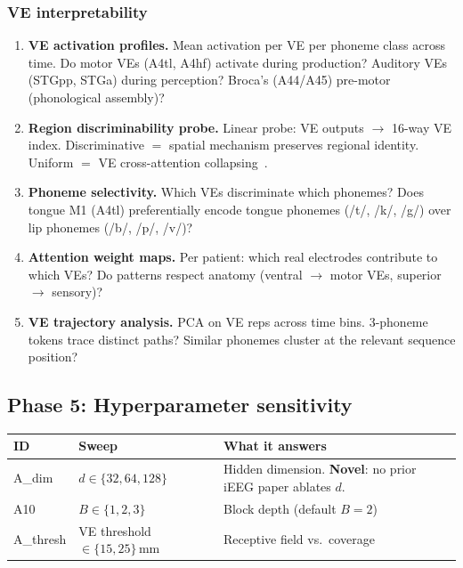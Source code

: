 \documentclass[11pt,letterpaper]{article}
\begin{document}
\subsubsection{VE interpretability}

\begin{enumerate}[leftmargin=2em]
\item \textbf{VE activation profiles.} Mean activation per VE per phoneme class across time. Do motor VEs (A4tl, A4hf) activate during production? Auditory VEs (STGpp, STGa) during perception? Broca's (A44/A45) pre-motor (phonological assembly)?
\item \textbf{Region discriminability probe.} Linear probe: VE outputs $\to$ 16-way VE index. Discriminative $=$ spatial mechanism preserves regional identity. Uniform $=$ VE cross-attention collapsing~\cite{zhang2025neds}.
\item \textbf{Phoneme selectivity.} Which VEs discriminate which phonemes? Does tongue M1 (A4tl) preferentially encode tongue phonemes (/t/, /k/, /g/) over lip phonemes (/b/, /p/, /v/)?
\item \textbf{Attention weight maps.} Per patient: which real electrodes contribute to which VEs? Do patterns respect anatomy (ventral $\to$ motor VEs, superior $\to$ sensory)?
\item \textbf{VE trajectory analysis.} PCA on VE reps across time bins. 3-phoneme tokens trace distinct paths? Similar phonemes cluster at the relevant sequence position?
\end{enumerate}

\subsection{Phase 5: Hyperparameter sensitivity}\label{sec:phase5}

\begin{table}[ht!]\centering\small
\begin{tabular}{@{}llp{6cm}@{}}
\toprule
\textbf{ID} & \textbf{Sweep} & \textbf{What it answers} \\
\midrule
A\_dim & $d \in \{32, 64, 128\}$ & Hidden dimension. \textbf{Novel}: no prior iEEG paper ablates $d$. \\
A10 & $B \in \{1, 2, 3\}$ & Block depth (default $B{=}2$) \\
A\_thresh & VE threshold $\in \{15, 25\}$\,mm & Receptive field vs.\ coverage \\
\bottomrule
\end{tabular}
\end{table}
\end{document}
